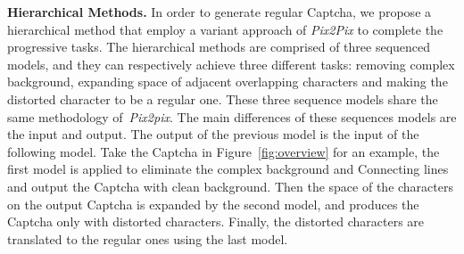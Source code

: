 \noindent \textbf{Hierarchical Methods.} In order to generate regular Captcha, we propose a hierarchical method that employ a variant approach of \emph{Pix2Pix} to complete the progressive tasks.
The hierarchical methods are comprised of three sequenced models, and they can respectively achieve three different tasks: removing complex background, expanding space of adjacent overlapping characters and making the distorted character to be a regular one. These three sequence models share the same methodology of~\emph{Pix2pix}.
The main differences of these sequences models are the input and output.
The output of the previous model is the input of the following model.
Take the Captcha in Figure~\ref{fig:overview} for an example, the first model is applied to eliminate the complex background and Connecting lines and output the Captcha with clean background. Then the space of the characters on the output Captcha is expanded by the second model, and produces the Captcha only with distorted characters. Finally, the distorted characters are translated to the regular ones using the last model.

